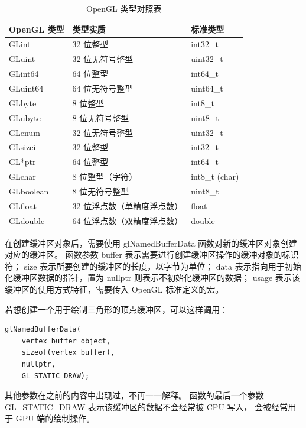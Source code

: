 \documentclass[fontset=windows]{ctexart}
\begin{document}
\begin{table}[htbp]
    \centering
    \begin{tabular}{|l|l|l|}
        \hline
        OpenGL 类型 & 类型实质 & 标准类型\\
        \hline
        GLint & 32 位整型 & int32\_t\\
        \hline
        GLuint & 32 位无符号整型 & uint32\_t\\
        \hline
        GLint64 & 64 位整型 & int64\_t\\
        \hline
        GLuint64 & 64 位无符号整型 & uint64\_t\\
        \hline
        GLbyte & 8 位整型 & int8\_t\\
        \hline
        GLubyte & 8 位无符号整型 & uint8\_t\\
        \hline
        GLenum & 32 位无符号整型 & uint32\_t\\
        \hline
        GLsizei & 32 位整型 & int32\_t\\
        \hline
        GL*ptr & 64 位整型 & int64\_t\\
        \hline
        GLchar & 8 位整型（字符） & int8\_t (char)\\
        \hline
        GLboolean & 8 位无符号整型 & uint8\_t\\
        \hline
        GLfloat & 32 位浮点数（单精度浮点数） & float\\
        \hline
        GLdouble & 64 位浮点数（双精度浮点数） & double\\
        \hline
    \end{tabular}
    \caption{OpenGL 类型对照表}
    \label{tab-gl:opengl-type}
\end{table}

在创建缓冲区对象后，需要使用 glNamedBufferData 函数对新的缓冲区对象创建对应的缓冲区。
函数参数 buffer 表示需要进行创建缓冲区操作的缓冲对象的标识符；
size 表示所要创建的缓冲区的长度，以字节为单位；
data 表示指向用于初始化缓冲区数据的指针，置为 nullptr 则表示不初始化缓冲区的数据；
usage 表示该缓冲区的使用方式特征，需要传入 OpenGL 标准定义的宏。

若想创建一个用于绘制三角形的顶点缓冲区，可以这样调用：

\begin{lstlisting}
glNamedBufferData(
    vertex_buffer_object,
    sizeof(vertex_buffer),
    nullptr,
    GL_STATIC_DRAW);
\end{lstlisting}

其他参数在之前的内容中出现过，不再一一解释。
函数的最后一个参数 GL\_STATIC\_DRAW 表示该缓冲区的数据不会经常被 CPU 写入，
会被经常用于 GPU 端的绘制操作。
\end{document}
